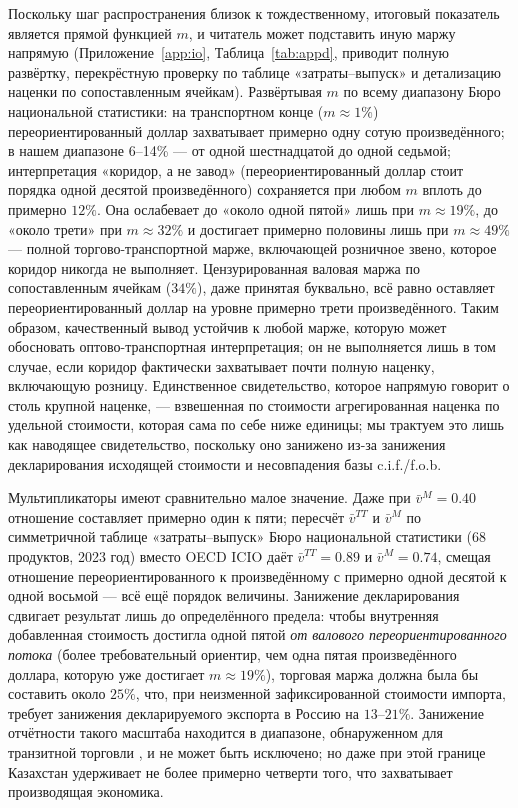\documentclass[12pt]{article}
\begin{document}
Поскольку шаг распространения близок к тождественному, итоговый показатель является прямой
функцией $m$, и читатель может подставить иную маржу напрямую (Приложение~\ref{app:io},
Таблица~\ref{tab:appd}, приводит полную развёртку, перекрёстную проверку по таблице
«затраты--выпуск» и детализацию наценки по сопоставленным ячейкам). Развёртывая $m$ по всему
диапазону Бюро национальной статистики: на транспортном конце ($m \approx 1\%$)
переориентированный доллар захватывает примерно одну сотую произведённого; в нашем
диапазоне 6--14\% — от одной шестнадцатой до одной седьмой; интерпретация «коридор, а не
завод» (переориентированный доллар стоит порядка одной десятой произведённого) сохраняется
при любом $m$ вплоть до примерно $12\%$. Она ослабевает до «около одной пятой» лишь при
$m \approx 19\%$, до «около трети» при $m \approx 32\%$ и достигает примерно половины лишь
при $m \approx 49\%$ — полной торгово-транспортной марже, включающей розничное звено,
которое коридор никогда не выполняет. Цензурированная валовая маржа по сопоставленным
ячейкам ($34\%$), даже принятая буквально, всё равно оставляет переориентированный доллар на
уровне примерно трети произведённого. Таким образом, качественный вывод устойчив к любой
марже, которую может обосновать оптово-транспортная интерпретация; он не выполняется лишь в
том случае, если коридор фактически захватывает почти полную наценку, включающую розницу.
Единственное свидетельство, которое напрямую говорит о столь крупной наценке, —
взвешенная по стоимости агрегированная наценка по удельной стоимости, которая сама по себе
ниже единицы; мы трактуем это лишь как наводящее свидетельство, поскольку оно занижено
из-за занижения декларирования исходящей стоимости и несовпадения базы c.i.f./f.o.b.

Мультипликаторы имеют сравнительно малое значение. Даже при $\bar v^{M} = 0.40$ отношение
составляет примерно один к пяти; пересчёт $\bar v^{TT}$ и $\bar v^{M}$ по симметричной
таблице «затраты--выпуск» Бюро национальной статистики (68 продуктов, 2023 год) вместо
OECD ICIO даёт $\bar v^{TT} = 0.89$ и $\bar v^{M} = 0.74$, смещая отношение
переориентированного к произведённому с примерно одной десятой к одной восьмой — всё ещё
порядок величины. Занижение декларирования сдвигает результат лишь до определённого предела:
чтобы внутренняя добавленная стоимость достигла одной пятой \emph{от валового
переориентированного потока} (более требовательный ориентир, чем одна пятая произведённого
доллара, которую уже достигает $m \approx 19\%$), торговая маржа должна была бы составить
около $25\%$, что, при неизменной зафиксированной стоимости импорта, требует занижения
декларируемого экспорта в Россию на $13$--$21\%$. Занижение отчётности такого масштаба
находится в диапазоне, обнаруженном для транзитной торговли \citep{fisman2004missing}, и не
может быть исключено; но даже при этой границе Казахстан удерживает не более примерно
четверти того, что захватывает производящая экономика.
\end{document}
